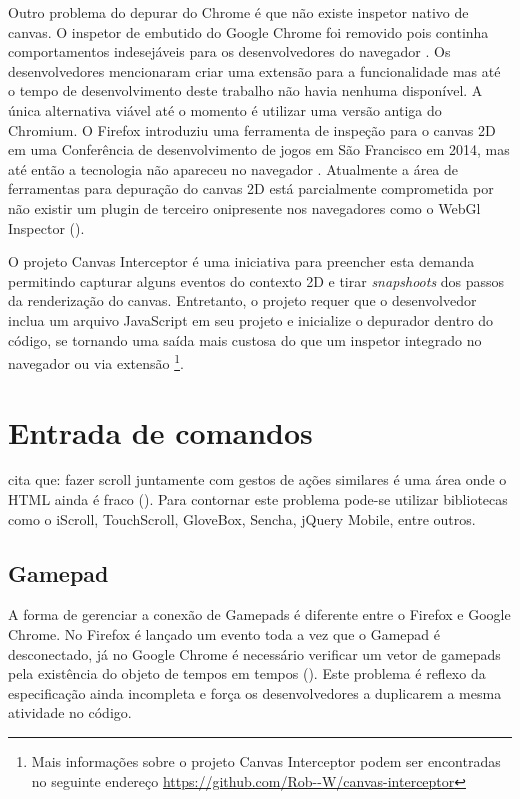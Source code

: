 Outro problema do depurar do Chrome é que não existe inspetor
nativo de canvas. O inspetor de embutido do Google Chrome foi
removido pois continha comportamentos indesejáveis para os
desenvolvedores do navegador \autocite{canvasinspector}. Os
desenvolvedores mencionaram criar uma extensão para a funcionalidade
mas até o tempo de desenvolvimento deste trabalho não havia
nenhuma disponível. A única alternativa viável até o momento é
utilizar uma versão antiga do Chromium. O Firefox introduziu uma
ferramenta de inspeção para o canvas 2D em uma Conferência de
desenvolvimento de jogos em São Francisco em 2014, mas até então a
tecnologia não apareceu no navegador \autocite{firefoxCanvasDebug}.
Atualmente a área de ferramentas para depuração do canvas
2D está parcialmente comprometida por não existir um plugin
de terceiro onipresente nos navegadores como o WebGl Inspector
().

O projeto Canvas Interceptor é uma iniciativa para preencher
esta demanda permitindo capturar alguns eventos do contexto 2D e
tirar \textit{snapshoots} dos passos da renderização do canvas.
Entretanto, o projeto requer que o desenvolvedor inclua um arquivo
JavaScript em seu projeto e inicialize o depurador dentro do código,
se tornando uma saída mais custosa do que um inspetor integrado
no navegador ou via extensão \footnote{Mais informações sobre o
projeto Canvas Interceptor podem ser encontradas no seguinte endereço
\url{https://github.com/Rob--W/canvas-interceptor}}.

\section{Entrada de comandos}

\citet[p. 9]{aSeriousContender} cita que: fazer scroll juntamente
com gestos de ações similares é uma área onde o HTML ainda é
fraco (). Para contornar este problema pode-se utilizar bibliotecas como o
iScroll, TouchScroll, GloveBox, Sencha, jQuery Mobile, entre outros.

\subsection{Gamepad}

A forma de gerenciar a conexão de Gamepads é diferente entre o Firefox
e Google Chrome. No Firefox é lançado um evento toda a vez que o
Gamepad é desconectado, já no Google Chrome é necessário verificar
um vetor de gamepads pela existência do objeto de tempos em tempos
\autocite{gamepad} (). Este problema é
reflexo da especificação ainda incompleta e força os desenvolvedores
a duplicarem a mesma atividade no código.

